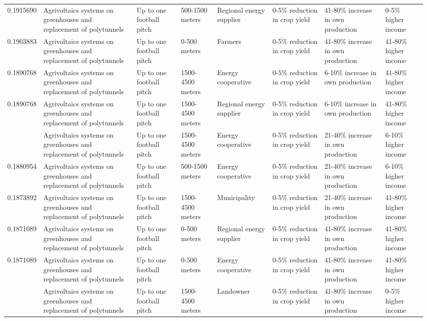 \begin{table}
\begin{tabular}[t]{rlllllll}
0.1915690 & Agrivoltaics systems on greenhouses
and replacement of polytunnels & Up to one football pitch & 500-1500 meters & Regional energy supplier & 0-5\% reduction in crop yield & 41-80\% increase in own production & 0-5\% higher income\\
0.1903883 & Agrivoltaics systems on greenhouses
and replacement of polytunnels & Up to one football pitch & 0-500 meters & Farmers & 0-5\% reduction in crop yield & 41-80\% increase in own production & 41-80\% higher income\\
0.1890768 & Agrivoltaics systems on greenhouses
and replacement of polytunnels & Up to one football pitch & 1500-4500 meters & Energy cooperative & 0-5\% reduction in crop yield & 6-10\% increase in own production & 41-80\% higher income\\
0.1890768 & Agrivoltaics systems on greenhouses
and replacement of polytunnels & Up to one football pitch & 1500-4500 meters & Regional energy supplier & 0-5\% reduction in crop yield & 6-10\% increase in own production & 41-80\% higher income\\
\addlinespace
0.1887290 & Agrivoltaics systems on greenhouses
and replacement of polytunnels & Up to one football pitch & 1500-4500 meters & Energy cooperative & 0-5\% reduction in crop yield & 21-40\% increase in own production & 6-10\% higher income\\
0.1880954 & Agrivoltaics systems on greenhouses
and replacement of polytunnels & Up to one football pitch & 500-1500 meters & Energy cooperative & 0-5\% reduction in crop yield & 21-40\% increase in own production & 6-10\% higher income\\
0.1873892 & Agrivoltaics systems on greenhouses
and replacement of polytunnels & Up to one football pitch & 1500-4500 meters & Municipality & 0-5\% reduction in crop yield & 21-40\% increase in own production & 41-80\% higher income\\
0.1871089 & Agrivoltaics systems on greenhouses
and replacement of polytunnels & Up to one football pitch & 0-500 meters & Regional energy supplier & 0-5\% reduction in crop yield & 41-80\% increase in own production & 41-80\% higher income\\
0.1871089 & Agrivoltaics systems on greenhouses
and replacement of polytunnels & Up to one football pitch & 0-500 meters & Energy cooperative & 0-5\% reduction in crop yield & 41-80\% increase in own production & 41-80\% higher income\\
\addlinespace
0.1864201 & Agrivoltaics systems on greenhouses
and replacement of polytunnels & Up to one football pitch & 1500-4500 meters & Landowner & 0-5\% reduction in crop yield & 41-80\% increase in own production & 0-5\% higher income\\

\end{tabular}
\end{table}
